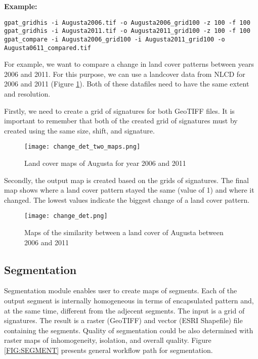 {\bf Example:}

\begin{minipage}{\linewidth}
\begin{lstlisting}
gpat_gridhis -i Augusta2006.tif -o Augusta2006_grid100 -z 100 -f 100
gpat_gridhis -i Augusta2011.tif -o Augusta2011_grid100 -z 100 -f 100
gpat_compare -i Augusta2006_grid100 -i Augusta2011_grid100 -o Augusta0611_compared.tif
\end{lstlisting}
\end{minipage}

For example, we want to compare a change in land cover patterns between years 2006 and 2011. 
For this purpose, we can use a landcover data from NLCD for 2006 and 2011 (Figure \ref{FIG:CHANGEDET1}).
Both of these datafiles need to have the same extent and resolution.

Firstly, we need to create a grid of signatures for both GeoTIFF files.
It is important to remember that both of the created grid of signatures must by created using the same size, shift, and signature.

\begin{figure}[H]
	\centering
	\texttt{[image: change\_det\_two\_maps.png]}
	\caption{Land cover maps of Augusta for year 2006 and 2011}
	\label{FIG:CHANGEDET1}
\end{figure}

Secondly, the output map is created based on the grids of signatures.
The final map shows where a land cover pattern stayed the same (value of 1) and where it changed. 
The lowest values indicate the biggest change of a land cover pattern.

\begin{figure}[H]
	\centering
	\texttt{[image: change\_det.png]}
	\caption{Maps of the similarity between a land cover of Augusta between 2006 and 2011}
	\label{FIG:CHANGEDET2}
\end{figure}

\FloatBarrier

\subsection{Segmentation \label{segmentation}}

Segmentation module enables user to create maps of segments.
Each of the output segment is internally homogeneous in terms of encapsulated pattern and, at the same time, different from the adjecent segments.
The input is a grid of signatures.
The result is a raster (GeoTIFF) and vector (ESRI Shapefile) file containing the segments.
Quality of segmentation could be also determined with raster maps of inhomogeneity, isolation, and overall quality.
Figure \ref{FIG:SEGMENT} presents general workflow path for segmentation. 

